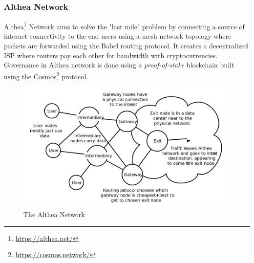 		\subsubsection{Althea Network}
		Althea\footnote{\url{https://althea.net/}} Network aims to solve the "last mile" problem by connecting a source of internet connectivity to the end users using a mesh network topology where packets are forwarded using the Babel routing protocol\cite{chroboczek2011babel}. It creates a decentralized ISP where routers pay each other for bandwidth with cryptocurrencies. Governance in Althea network is done using a \textit{proof-of-stake} blockchain built using the Cosmos\footnote{\url{https://cosmos.network/}} protocol.
		
		\begin{figure}[h]
			\includegraphics[width=\linewidth]{figures/althea-network}
			\caption{\label{fig:althea-network} The Althea Network\protect\footnotemark}
		\end{figure}
	